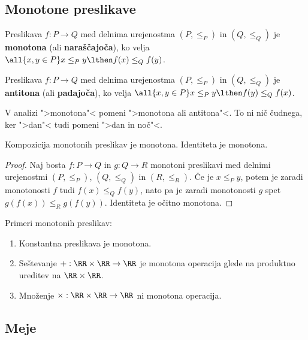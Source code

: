 \subsection{Monotone preslikave}

\begin{definicija}
  Preslikava $f : P \to Q$ med delnima urejenostma $(P, {\leq_P})$ in $(Q, {\leq_Q})$ je
  \textbf{monotona} (ali \textbf{naraščajoča}), ko velja $\all{x, y \in P} x \leq_P y \lthen f(x) \leq_Q f(y)$.
\end{definicija}

\begin{definicija}
  Preslikava $f : P \to Q$ med delnima urejenostma $(P, \leq_P)$ in $(Q, \leq_Q)$ je
  \textbf{antitona} (ali \textbf{padajoča}), ko velja $\all{x, y \in P} x \leq_P y \lthen f(y) \leq_Q f(x)$.
\end{definicija}

\begin{opomba}
  V analizi ">monotona"< pomeni ">monotona ali antitona"<. To ni nič
  čudnega, ker ">dan"< tudi pomeni ">dan in noč"<.
\end{opomba}

\begin{izrek}
  Kompozicija monotonih preslikav je monotona. Identiteta je monotona.
\end{izrek}

\begin{proof}
  Naj bosta $f : P \to Q$ in $g : Q \to R$ monotoni preslikavi med delnimi
  urejenostmi $(P, {\leq_P})$, $(Q, {\leq_Q})$ in $(R, {\leq_R})$. Če je $x \leq_P y$, potem je zaradi monotonosti $f$ tudi $f(x) \leq_Q f(y)$, nato pa je zaradi monotonosti $g$ spet $g(f(x)) \leq_R g(f(y))$. Identiteta je očitno monotona.
\end{proof}

\begin{zgled}
  Primeri monotonih preslikav:
  \begin{enumerate}
    \item Konstantna preslikava je monotona.
    \item Seštevanje ${+} : \RR \times \RR \to \RR$ je monotona operacija glede na produktno ureditev na $\RR \times \RR$.
    \item Množenje ${\times} : \RR \times \RR \to \RR$ ni monotona operacija.
  \end{enumerate}
\end{zgled}


\subsection{Meje}

